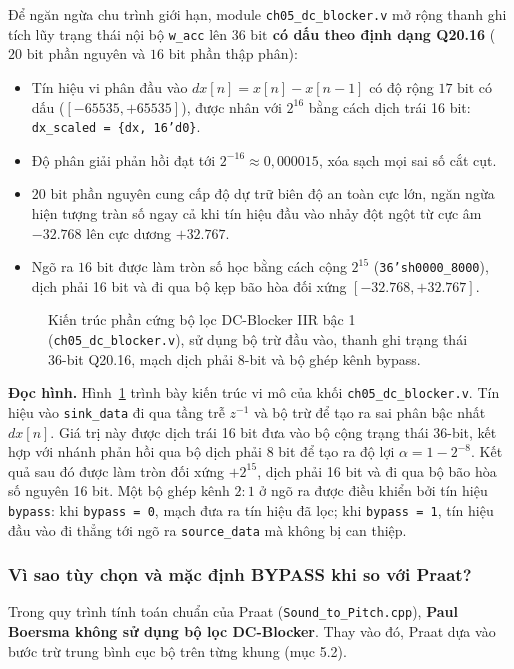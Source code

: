 Để ngăn ngừa chu trình giới hạn, module \texttt{ch05\_dc\_blocker.v} mở rộng thanh ghi tích lũy trạng thái nội bộ \texttt{w\_acc} lên \textbf{$36\text{ bit}$ có dấu theo định dạng Q20.16} ($20\text{ bit}$ phần nguyên và $16\text{ bit}$ phần thập phân):
\begin{itemize}[leftmargin=1.5em, itemsep=2pt]
    \item Tín hiệu vi phân đầu vào $dx[n] = x[n] - x[n-1]$ có độ rộng $17\text{ bit}$ có dấu ($[-65535, +65535]$), được nhân với $2^{16}$ bằng cách dịch trái 16 bit: \texttt{dx\_scaled = \{dx, 16'd0\}}.
    \item Độ phân giải phản hồi đạt tới $2^{-16} \approx 0{,}000015$, xóa sạch mọi sai số cắt cụt.
    \item $20\text{ bit}$ phần nguyên cung cấp độ dự trữ biên độ an toàn cực lớn, ngăn ngừa hiện tượng tràn số ngay cả khi tín hiệu đầu vào nhảy đột ngột từ cực âm $-32.768$ lên cực dương $+32.767$.
    \item Ngõ ra $16\text{ bit}$ được làm tròn số học bằng cách cộng $2^{15}$ (\texttt{36'sh0000\_8000}), dịch phải 16 bit và đi qua bộ kẹp bão hòa đối xứng $[-32.768, +32.767]$.
\end{itemize}

\begin{figure}[H]
\centering
\resizebox{\textwidth}{!}{}
\caption{Kiến trúc phần cứng bộ lọc DC-Blocker IIR bậc 1 (\texttt{ch05\_dc\_blocker.v}), sử dụng bộ trừ đầu vào, thanh ghi trạng thái 36-bit Q20.16, mạch dịch phải 8-bit và bộ ghép kênh bypass.}
\label{fig:ch05_dc_blocker}
\end{figure}

\textbf{Đọc hình.} Hình~\ref{fig:ch05_dc_blocker} trình bày kiến trúc vi mô của khối \texttt{ch05\_dc\_blocker.v}. Tín hiệu vào \texttt{sink\_data} đi qua tầng trễ $z^{-1}$ và bộ trừ để tạo ra sai phân bậc nhất $dx[n]$. Giá trị này được dịch trái 16 bit đưa vào bộ cộng trạng thái 36-bit, kết hợp với nhánh phản hồi qua bộ dịch phải 8 bit để tạo ra độ lợi $\alpha = 1 - 2^{-8}$. Kết quả sau đó được làm tròn đối xứng $+2^{15}$, dịch phải 16 bit và đi qua bộ bão hòa số nguyên 16 bit. Một bộ ghép kênh $2:1$ ở ngõ ra được điều khiển bởi tín hiệu \texttt{bypass}: khi \texttt{bypass = 0}, mạch đưa ra tín hiệu đã lọc; khi \texttt{bypass = 1}, tín hiệu đầu vào đi thẳng tới ngõ ra \texttt{source\_data} mà không bị can thiệp.

\subsubsection*{Vì sao tùy chọn và mặc định BYPASS khi so với Praat?}
Trong quy trình tính toán chuẩn của Praat (\texttt{Sound\_to\_Pitch.cpp}), \textbf{Paul Boersma không sử dụng bộ lọc DC-Blocker}. Thay vào đó, Praat dựa vào bước trừ trung bình cục bộ trên từng khung (mục 5.2).

